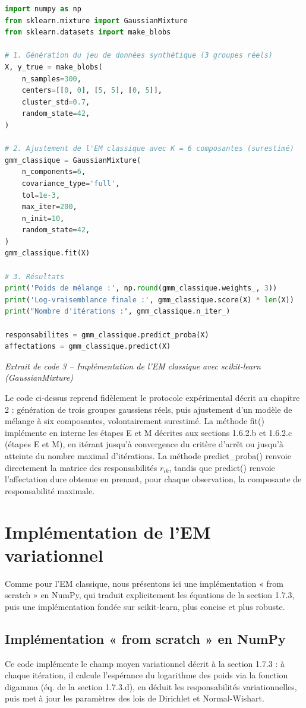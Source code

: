 \begin{lstlisting}[language=Python]
import numpy as np
from sklearn.mixture import GaussianMixture
from sklearn.datasets import make_blobs

# 1. Génération du jeu de données synthétique (3 groupes réels)
X, y_true = make_blobs(
    n_samples=300,
    centers=[[0, 0], [5, 5], [0, 5]],
    cluster_std=0.7,
    random_state=42,
)

# 2. Ajustement de l'EM classique avec K = 6 composantes (surestimé)
gmm_classique = GaussianMixture(
    n_components=6,
    covariance_type='full',
    tol=1e-3,
    max_iter=200,
    n_init=10,
    random_state=42,
)
gmm_classique.fit(X)

# 3. Résultats
print('Poids de mélange :', np.round(gmm_classique.weights_, 3))
print('Log-vraisemblance finale :', gmm_classique.score(X) * len(X))
print("Nombre d'itérations :", gmm_classique.n_iter_)

responsabilites = gmm_classique.predict_proba(X)
affectations = gmm_classique.predict(X)
\end{lstlisting}
\begin{center}\small\emph{Extrait de code 3 -- Implémentation de l'EM classique avec scikit-learn (GaussianMixture)}\end{center}
Le code ci-dessus reprend fidèlement le protocole expérimental décrit au chapitre 2 : génération de trois groupes gaussiens réels, puis ajustement d'un modèle de mélange à six composantes, volontairement surestimé. La méthode fit() implémente en interne les étapes E et M décrites aux sections 1.6.2.b et 1.6.2.c (étapes E et M), en itérant jusqu'à convergence du critère d'arrêt ou jusqu'à atteinte du nombre maximal d'itérations. La méthode predict\_proba() renvoie directement la matrice des responsabilités $r_{ik}$, tandis que predict() renvoie l'affectation dure obtenue en prenant, pour chaque observation, la composante de responsabilité maximale.

\section{Implémentation de l'EM variationnel}
Comme pour l'EM classique, nous présentons ici une implémentation « from scratch » en NumPy, qui traduit explicitement les équations de la section 1.7.3, puis une implémentation fondée sur scikit-learn, plus concise et plus robuste.

\subsection{Implémentation « from scratch » en NumPy}
Ce code implémente le champ moyen variationnel décrit à la section 1.7.3 : à chaque itération, il calcule l'espérance du logarithme des poids via la fonction digamma (éq. de la section 1.7.3.d), en déduit les responsabilités variationnelles, puis met à jour les paramètres des lois de Dirichlet et Normal-Wishart.

